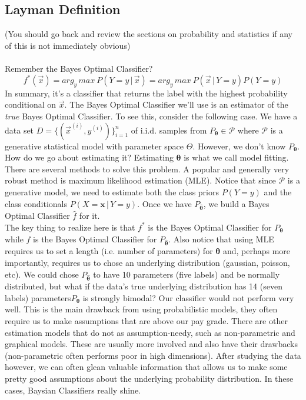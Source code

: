 \documentclass[10pt]{article}
\begin{document}
	\subsection*{Layman Definition}
		(You should go back and review the sections on probability and statistics if any of this is not immediately obvious) \\ \\
		Remember the Bayes Optimal Classifier? 		
		$$ f^*(\vec x) = arg_y \, max \ P(Y = y\, | \, \vec x ) = arg_y \, max \ P(\vec x \, | \, Y=y)P(Y = y)$$
		In summary, it's a classifier that returns the label with the highest probability conditional on $\vec x$. 
		The Bayes Optimal Classifier we'll use is an estimator of the \textit{true} Bayes Optimal Classifier. 
		To see this, consider the following case. We have a data set $D = \{ (\vec x^{(i)}, y^{(i)})\}_{i=1}^n$ of
		i.i.d. samples from $P_{\pmb \theta} \in \mathcal P$ where $\mathcal P$ is a generative statistical model with 
		parameter space $\Theta$. However, we don't know $P_{\pmb \theta}$. How do we go about estimating it? 
		Estimating $\pmb \theta$ is what we call model fitting. There are several methods to solve this problem. 
		A popular and generally very robust method is maximum likelihood estimation (MLE). Notice 
		that since $\mathcal P$ is a generative model, we need to estimate both the class priors $P(Y=y)$ and the class 
		conditionals $P(X=\textbf{x} \, | \, Y=y)$. Once we have $P_{\hat{ \pmb \theta}}$, we build a Bayes 
		Optimal Classifier $\hat f$ for it. \\
		
		\noindent The key thing to realize here is that $f^*$ is the Bayes Optimal Classifier for $P_{\pmb \theta}$ while
		$\hat f$ is the Bayes Optimal Classifier for $P_{\hat{ \pmb \theta}}$. Also notice that using MLE requires us to
		set a length (i.e. number of parameters) for $\pmb \theta$ and, perhaps more importantly, requires us to chose 
		an underlying distribution (gaussian, poisson, etc). We could chose $P_{\hat{\pmb \theta}}$ to have 10 
		parameters (five labels) and be normally distributed, but what if the data's true underlying distribution has 
		14 (seven labels) parameters$P_{{\pmb \theta}}$ is strongly bimodal? Our classifier would not perform very
		well. This is the main drawback from using probabilistic models, they often require us to make assumptions that
		are above our pay grade. There are other estimation models that do not as assumption-needy, such as 
		non-parametric and graphical models. These are usually more involved and also have their drawbacks 
		(non-parametric often performs poor in high dimensions). After studying the data however,  we can often 
		glean valuable information that allows us to make some pretty good assumptions about the underlying 
		probability distribution. In these cases, Baysian Classifiers really shine.
		\\ 
		
\end{document}
